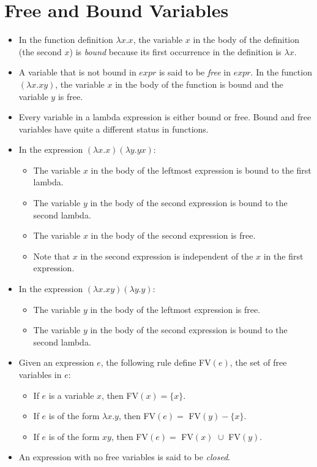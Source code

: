 \documentclass[]{article}
\begin{document}
\section{Free and Bound Variables}
\begin{itemize}
\item In the function definition $\lambda x.x$, the variable $x$ in the body of
the definition (the second $x$) is \emph{bound} because its first occurrence in
the definition is $\lambda x$.
\item A variable that is not bound in $expr$ is said to be \emph{free} in
$expr$. In the function $(\lambda x.xy)$, the variable $x$ in the body of the
function is bound and the variable $y$ is free.
\item Every variable in a lambda expression is either bound or free. Bound and
free variables have quite a different status in functions.
\item In the expression $(\lambda x.x)(\lambda y.yx)$:
\begin{itemize}
\item The variable $x$ in the body of the leftmost expression is bound to the
first lambda.
\item The variable $y$ in the body of the second expression is bound to the
second lambda.
\item The variable $x$ in the body of the second expression is free.
\item Note that $x$ in the second expression is independent of the $x$ in the
first expression.
\end{itemize}
\item In the expression $(\lambda x.xy)(\lambda y.y)$:
\begin{itemize}
\item The variable $y$ in the body of the leftmost expression is free.
\item The variable $y$ in the body of the second expression is bound to the
second lambda.
\end{itemize}
\item Given an expression $e$, the following rule define FV$(e)$, the set of
free variables in $e$:
\begin{itemize}
\item If $e$ is a variable $x$, then FV$(x) = \{x\}$.
\item If $e$ is of the form $\lambda x.y$, then FV$(e) =$ FV$(y) - \{x\}$.
\item If $e$ is of the form $xy$, then FV$(e) =$ FV$(x)\,\,\cup$ FV$(y)$.
\end{itemize}
\item An expression with no free variables is said to be \emph{closed}.
\end{itemize}
\end{document}
